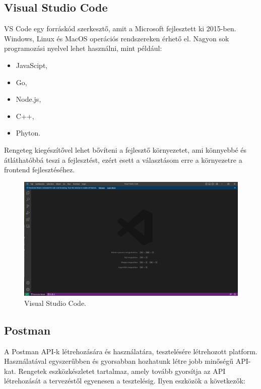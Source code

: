 \subsection{Visual Studio Code}

VS Code egy forráskód szerkesztő, amit a Microsoft fejlesztett ki 2015-ben\cite{VSCode}. Windows, Linux és MacOS operációs rendszereken érhető el. Nagyon sok programozási nyelvel lehet használni, mint például:

\begin{itemize}
\item JavaScipt,
\item Go,
\item Node.js,
\item C++,
\item Phyton.
\end{itemize}

Rengeteg kiegészítővel lehet bővíteni a fejlesztő környezetet, ami könnyebbé és átláthatóbbá teszi a fejlesztést, ezért esett a választásom erre a környezetre a frontend fejlesztéséhez.

\begin{figure}[h]
\centering
\includegraphics[scale=0.6]{images/VSCode.png}
\caption{Visual Studio Code.}
\label{fig:VSCode}
\end{figure}
\newpage

\subsection{Postman}

A Postman \cite{Postman} API-k létrehozására és használatára, tesztelésére létrehozott platform. Használatával egyszerűbben és gyorsabban hozhatunk létre jobb minőségű API-kat. Rengetek eszközkészletet tartalmaz, amely tovább gyorsítja az API létrehozását a  tervezéstől egyenesen a tesztelésig. Ilyen eszközök a következők:

